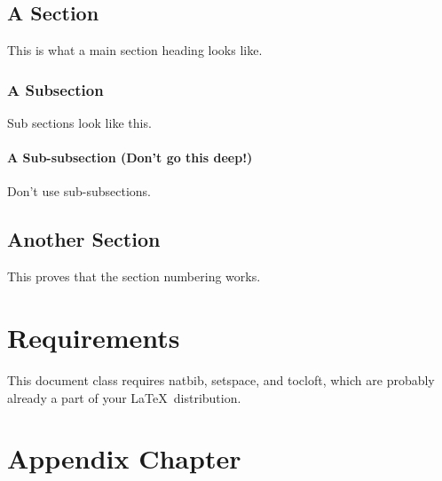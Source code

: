 \documentclass{umlthesis}
\begin{document}
\section{A Section}
This is what a main section heading looks like.

\lipsum[1]

\subsection{A Subsection}
Sub sections look like this.

\lipsum[1]

\subsubsection{A Sub-subsection (Don't go this deep!)}
Don't use sub-subsections.

\lipsum[1]

\section{Another Section}
This proves that the section numbering works.

\chapter{Requirements}

\newcommand{\pkg}[1]{\textsf{#1}}

This document class requires \pkg{natbib},  \pkg{setspace}, and \pkg{tocloft}, which are probably already a part of your \LaTeX\ distribution.

\nocite{*}



\appendix
\chapter{Appendix Chapter}
\lipsum[2]
\end{document}

